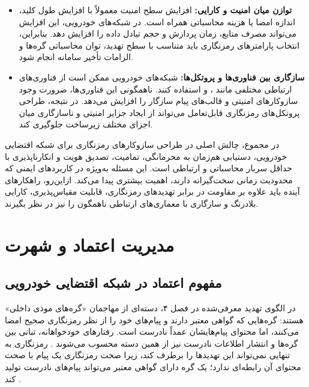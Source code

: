 \documentclass[12pt,a4paper]{article}
\begin{document}
\begin{itemize}
\item \textbf{توازن میان امنیت و کارایی:} افزایش سطح امنیت معمولاً با افزایش طول کلید، اندازه امضا یا هزینه محاسباتی همراه است. در شبکه‌های خودرویی، این افزایش می‌تواند مصرف منابع، زمان پردازش و حجم تبادل داده را افزایش دهد. بنابراین، انتخاب پارامترهای رمزنگاری باید متناسب با سطح تهدید، توان محاسباتی گره‌ها و الزامات تأخیر سامانه انجام شود.

\item \textbf{سازگاری بین فناوری‌ها و پروتکل‌ها:} شبکه‌های خودرویی ممکن است از فناوری‌های ارتباطی مختلفی مانند ،  و  استفاده کنند. ناهمگونی این فناوری‌ها، ضرورت وجود سازوکارهای امنیتی و قالب‌های پیام سازگار را افزایش می‌دهد. در نتیجه، طراحی پروتکل‌های رمزنگاری قابل‌تعامل می‌تواند از ایجاد جزایر امنیتی و ناسازگاری میان اجزای مختلف زیرساخت جلوگیری کند.

\end{itemize}

در مجموع، چالش اصلی در طراحی سازوکارهای رمزنگاری برای شبکه اقتضایی خودرویی، دستیابی هم‌زمان به محرمانگی، تمامیت، تصدیق هویت و انکارناپذیری با حداقل سربار محاسباتی و ارتباطی است. این مسئله به‌ویژه در کاربردهای ایمنی که محدودیت زمانی سخت‌گیرانه دارند، اهمیت بیشتری پیدا می‌کند. ازاین‌رو، راهکارهای آینده باید علاوه بر مقاومت در برابر تهدیدهای رمزنگاری، قابلیت مقیاس‌پذیری، کارایی بلادرنگ و سازگاری با معماری‌های ارتباطی ناهمگون را نیز در نظر بگیرند.

\section{مدیریت اعتماد و شهرت}

\subsection{مفهوم اعتماد در شبکه اقتضایی خودرویی}

در الگوی تهدید معرفی‌شده در فصل ۴، دسته‌ای از مهاجمان «گره‌های موذی داخلی» هستند: گره‌هایی که گواهی معتبر دارند و پیام‌های خود را از نظر رمزنگاری صحیح امضا می‌کنند، اما محتوای پیام‌هایشان عمداً نادرست است. رفتارهای خودخواهانه، تبانی بین گره‌ها و انتشار اطلاعات نادرست نیز از همین دسته محسوب می‌شوند \cite{farsimadanReviewSecurityChallenges2025}. رمزنگاری به تنهایی نمی‌تواند این تهدیدها را برطرف کند، زیرا صحت رمزنگاری یک پیام با صحت محتوای آن رابطه‌ای ندارد؛ یک گره دارای گواهی معتبر می‌تواند پیام‌های نادرست تولید کند \cite{farsimadanReviewSecurityChallenges2025}.
\end{document}
